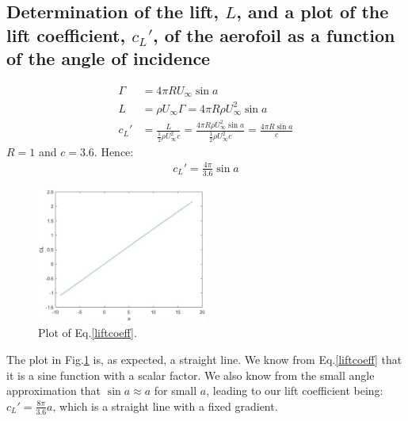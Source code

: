\documentclass[11pt]{article}
\begin{document}
\subsection*{Determination of the lift, $L$, and a plot of the lift coefficient, $c_L'$, of the aerofoil as a function of the angle of incidence}
\begin{align}
  \Gamma &= 4\pi R U_{\infty} \sin a\\
  L &= \rho U_{\infty} \Gamma = 4\pi R \rho U_{\infty}^2 \sin a\\
  c_L' &= \frac{L}{\frac{1}{2}\rho U_{\infty}^2 c} = \frac{4\pi R \rho U_{\infty}^2 \sin a}{\frac{1}{2}\rho U_{\infty}^2 c} = \frac{4\pi R \sin a}{c}
\end{align}
$R=1$ and $c=3.6$. Hence:
\begin{align}
  c_L' = \frac{4\pi}{3.6}\sin a \label{liftcoeff}
\end{align}
\begin{figure}[H]
  \centering
  \includegraphics[width=0.5\textwidth]{./img/diagram12.png}
  \caption{Plot of Eq.\ref{liftcoeff}.}
  \label{liftcoeffplot}
\end{figure}
The plot in Fig.\ref{liftcoeffplot} is, as expected, a straight line. We know from Eq.\ref{liftcoeff} that it is a sine function with a scalar factor. We also know from the small angle approximation that $\sin a \approx a$ for small $a$, leading to our lift coefficient being: $c_L' = \frac{8\pi}{3.6}a$, which is a straight line with a fixed gradient. 
\end{document}

